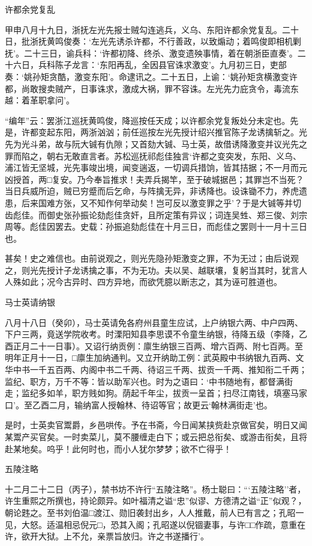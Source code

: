 \documentclass[]{article}
\begin{document}
许都余党复乱

甲申八月十九日，浙抚左光先报士贼勾连逃兵，义乌、东阳许都余党复乱。二十日，批浙抚黄鸣俊奏：`左光先诱杀许都，不行善政，以致煽动；着鸣俊即相机剿抚'。二十三日，谕兵科：`许都初降、终杀、激变遗殃事情，着在朝浙臣直奏'。二十六日，兵科陈子龙言：`东阳再乱，全因县官诛求激变'。九月初三日，吏部奏：`姚孙矩贪酷，激变东阳'。命逮讯之。二十五日，上谕：`姚孙矩贪横激变许都，尚敢搜卖贼产，日事诛求，激成大祸，罪不容诛。左光先力庇贪令，毒流东越：着革职拿问'。

``编年''云：罢浙江巡抚黄鸣俊，降巡按任天成；以许都余党复叛处分未定也。先是，许都变起东阳，两浙汹汹；前任巡按左光先授计绍兴推官陈子龙诱擒斩之。光先为光斗弟，故与阮大铖有仇隙；又首劾大铖、马士英，故借诱降激变并议光先之罪而陷之，朝右无敢直言者。苏松巡抚祁彪佳独言`许都之变突发，东阳、义乌、浦江皆无坚城，光先事竣出境，闻变遄返，一切调兵措饷，皆其拮据；不一月而元凶授首，两□复安。乃今奉旨推求！夫弄兵揭竿，至于破城据邑；其罪岂不当死？当日兵威所迫，贼已穷蹙而后乞命，与阵擒无异，非诱降也。设诛锄不力，养虎遗患，后来国难方张，又不知作何举动矣！岂可反以激变罪之乎'？于是大铖等并切齿彪佳。而御史张孙振论劾彪佳贪奸，且所定策有异议；词连吴甡、郑三俊、刘宗周等。彪佳因罢去。史载：孙振追劾彪佳在十月三日，而彪佳之罢则十一月十三日也。

甚矣！史之难信也。由前说观之，则光先隐孙矩激变之罪，不为无过；由后说观之，则光先授计子龙诱擒之事，不为无功。夫以吴、越联壤，复躬当其时，犹言人人殊如此；况今古异时、四方异地，而欲凭臆以断志之，其为诬可胜道也。

马士英请纳银

八月十八日（癸卯），马士英请免各府州县童生应试，上户纳银六两、中户四两、下户三两，竟送学院收考。时溧阳知县李思谟不令童生纳银，待降五级（李降，乙酉正月二十一日事）。又诏行纳贡例：廪生纳银三百两、增六百两、附七百两。至明年正月十一日，□廪生加纳通判。又立开纳助工例：武英殿中书纳银九百两、文华中书一千五百两、内阁中书二千两、待诏三千两、拔贡一千两、推知衔二千两；监纪、职方，万千不等：皆以助军兴也。时为之语曰：`中书随地有，都督满街走；监纪多如羊，职方贱如狗。荫起千年尘，拔贡一呈首；扫尽江南钱，填塞马家口'。至乙酉二月，输纳富人授翰林、待诏等官；故更云`翰林满街走'也。

是时，士英卖官鬻爵，乡邑哄传。予在书斋，今日闻某挟赀赴京做官矣，明日又闻某鬻产买官矣。一时卖菜儿，莫不腰缠走白下；或云把总衔矣、或游击衔矣，且将赴某地矣。呜乎！此何时也，而小人犹尔梦梦；欲不亡得乎！

五陵注略

十二月二十二日（丙子），禁书坊不许行``五陵注略''。杨士聪曰：```五陵注略''者，许生重熙之所撰也，持论颇异。如叶福清之谥``忠''似谬、方德清之谥``正''似观？，朝论韪之。至书刘伯温□渡江、勋旧袭封出乡，人人推戴，前人已有言之；孔昭一见，大怒。适温相忌倪元□，恐其入阁；孔昭遂以倪锢妻事，与许□□作疏，意重在许，欲开大狱。上不允，亲票旨放归。许之书遂播行'。
\end{document}
